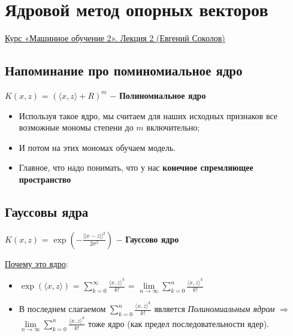 \newpage
\section{Ядровой метод опорных векторов}

    \href{https://www.youtube.com/watch?v=Kwmgy0zt2hM&list=PLEqoHzpnmTfAVdVl2fH_je2_jWCEPAAqv&index=2}{Курс «Машинное обучение 2». Лекция 2 (Евгений Соколов)}

    \subsection{Напоминание про поминомиальное ядро}

            \begin{center}
            \Large
                $K(x, z)$ = $(\langle x, z \rangle + R)^m$ $-$ \textbf{Полиномиальное ядро}
            \end{center}

            \begin{itemize}
                \item Используя такое ядро, мы считаем для наших исходных признаков все возможные мономы степени до $m$ включительно;

                \item И потом на этих мономах обучаем модель.

                \item Главное, что надо понимать, что у нас \textbf{конечное спремляющее пространство} 
            \end{itemize}

    \subsection{Гауссовы ядра}
        
       \begin{center}
       \Large
           $K(x, z)$ = $\exp(-\frac{||x - z||^2}{2\sigma^2})$ $-$ \textbf{Гауссово ядро}
       \end{center} 

        \underline{Почему это ядро}:
        \begin{itemize}
            \item \large{$\exp(\langle x, z \rangle)$ = $\sum\limits_{k = 0}^\infty \frac{\langle x, z \rangle^k}{k!}$ = $\lim\limits_{n \to \infty} \sum\limits_{k = 0}^n \frac{\langle x, z \rangle^k}{k!}$}

            \item В последнем слагаемом $\sum\limits_{k = 0}^n \frac{\langle x, z \rangle^k}{k!}$ является \textit{Полиномиальным ядром} $\Longrightarrow$ $\lim\limits_{n \to \infty} \sum\limits_{k = 0}^n \frac{\langle x, z \rangle^k}{k!}$ тоже ядро (как предел последовательности ядер).\\
        \end{itemize}

